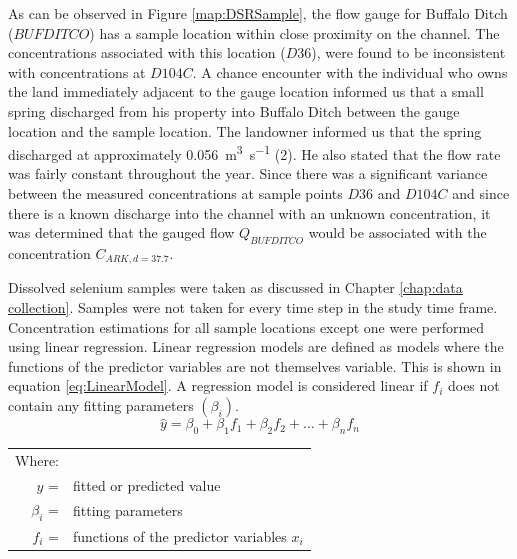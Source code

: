 \begin{linenumbers}
As can be observed in Figure \ref{map:DSRSample}, the flow gauge for Buffalo Ditch ($ BUFDITCO $) has a sample location within close proximity on the channel.  The concentrations associated with this location ($ D36 $), were found to be inconsistent with concentrations at $ D104C $.  A chance encounter with the individual who owns the land immediately adjacent to the gauge location informed us that a small spring discharged from his property into Buffalo Ditch between the gauge location and the sample location.  The landowner informed us that the spring discharged at approximately \SI{0.056}{\cubic\meter\per\second} (\SI{2}{\cfs}).  He also stated that the flow rate was fairly constant throughout the year.  Since there was a significant variance between the measured concentrations at sample points $ D36 $ and $ D104C $ and since there is a known discharge into the channel with an unknown concentration, it was determined that the gauged flow $ Q_{BUFDITCO} $ would be associated with the concentration $ C_{ARK,d=37.7} $.


Dissolved selenium samples were taken as discussed in Chapter \ref{chap:data collection}.  Samples were not taken for every time step in the study time frame.  Concentration estimations for all sample locations except one were performed using linear regression.  Linear regression models are defined as models where the functions of the predictor variables are not themselves variable.  This is shown in equation \ref{eq:LinearModel}.  A regression model is considered linear if $f_i$ does not contain any fitting parameters $(\beta_i)$.
\begin{equation}
\label{eq:LinearModel}
\hat{y}=\beta_0+\beta_1 f_1+\beta_2 f_2+\ldots+\beta_n f_n
\end{equation}
\begin{tabular}{r p{5.5in}}
Where:&\\
$\hat{y}$ = & fitted or predicted value\\
$\beta_i$ = & fitting parameters\\
$f_i$ = & functions of the predictor variables $x_i$\\
\end{tabular}\\


\end{linenumbers}
